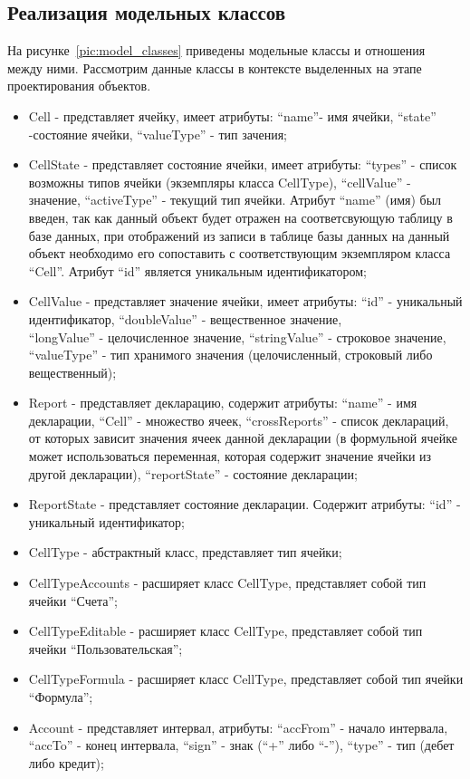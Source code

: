 \documentclass[14pt,a4paper]{reportmod}
\begin{document}
\subsection{Реализация модельных классов}
На рисунке~\ref{pic:model_classes} приведены модельные классы и отношения между ними. Рассмотрим данные классы в контексте выделенных на этапе проектирования объектов.
\begin{itemize}
  \item Cell - представляет ячейку, имеет атрибуты: ``name''- имя ячейки, ``state'' -состояние ячейки, ``valueType'' - тип зачения;
  \item CellState - представляет состояние ячейки, имеет атрибуты: ``types'' - список возможны типов ячейки (экземпляры класса CellType), ``cellValue'' - значение, ``activeType'' - текущий тип ячейки. Атрибут ``name'' (имя) был введен, так как данный объект будет отражен на соответсвующую таблицу в базе данных, при отображений из записи в таблице базы данных на данный объект необходимо его сопоставить с соответствующим экземпляром класса ``Cell''. Атрибут ``id'' является уникальным идентификатором;
  \item CellValue - представляет значение ячейки, имеет атрибуты: ``id'' - уникальный идентификатор, ``doubleValue'' - вещественное значение,\\ ``longValue'' - целочисленное значение, ``stringValue'' - строковое значение, ``valueType'' - тип хранимого значения (целочисленный, строковый либо вещественный);
  \item Report - представляет декларацию, содержит атрибуты: ``name'' - имя декларации, ``Cell'' - множество ячеек, ``crossReports'' - список деклараций, от которых зависит значения ячеек данной декларации (в формульной ячейке может использоваться переменная, которая содержит значение ячейки из другой декларации), ``reportState'' - состояние декларации;
  \item ReportState - представляет состояние декларации. Содержит атрибуты: ``id'' - уникальный идентификатор;
  \item CellType - абстрактный класс, представляет тип ячейки;
  \item CellTypeAccounts - расширяет класс CellType, представляет собой тип ячейки ``Счета'';
  \item CellTypeEditable - расширяет класс CellType, представляет собой тип ячейки ``Пользовательская'';
  \item CellTypeFormula - расширяет класс CellType, представляет собой тип ячейки ``Формула'';
  \item Account - представляет интервал, атрибуты: ``accFrom'' - начало интервала, ``accTo'' - конец интервала, ``sign'' - знак (``+'' либо ``-''), ``type'' - тип (дебет либо кредит);

\end{itemize}
\end{document}
